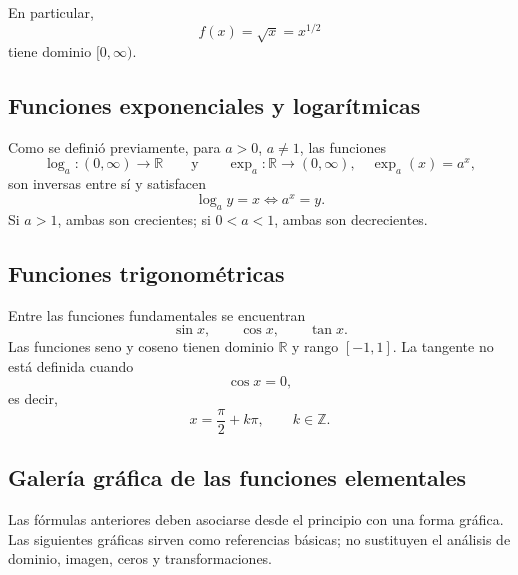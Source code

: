 \documentclass[12pt]{article}
\theoremstyle{remark}
\newcommand{\R}{\mathbb{R}}
\begin{document}
En particular,
\[
f(x)=\sqrt{x}=x^{1/2}
\]
tiene dominio $[0,\infty)$.

\subsection*{Funciones exponenciales y logarítmicas}

Como se definió previamente, para $a>0$, $a\neq1$, las funciones
\[
\log_a:(0,\infty)\to\R
\qquad\text{y}\qquad
\exp_a:\R\to(0,\infty),\quad \exp_a(x)=a^x,
\]
son inversas entre sí y satisfacen
\[
\boxed{\log_a y=x\Longleftrightarrow a^x=y}.
\]
Si $a>1$, ambas son crecientes; si $0<a<1$, ambas son decrecientes.

\subsection*{Funciones trigonométricas}

Entre las funciones fundamentales se encuentran
\[
\sin x,\qquad\cos x,\qquad\tan x.
\]
Las funciones seno y coseno tienen dominio $\R$ y rango $[-1,1]$. La tangente
no está definida cuando
\[
\cos x=0,
\]
es decir,
\[
x=\frac{\pi}{2}+k\pi,\qquad k\in\mathbb Z.
\]


\subsection*{Galería gráfica de las funciones elementales}

Las fórmulas anteriores deben asociarse desde el principio con una forma
gráfica. Las siguientes gráficas sirven como referencias básicas; no sustituyen
el análisis de dominio, imagen, ceros y transformaciones.

\begin{center}
\end{center}
\end{document}
